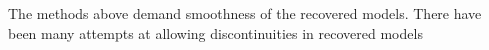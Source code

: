 The methods above demand smoothness of the recovered models. There have been many attempts at allowing discontinuities in recovered models




\endinput

 Interestingly, the assumption that all magnetizations are in the same direction also assumes that all Koenigsberger ratios are equal.

Any text after an \endinput is ignored.
You could put scraps here or things in progress.
